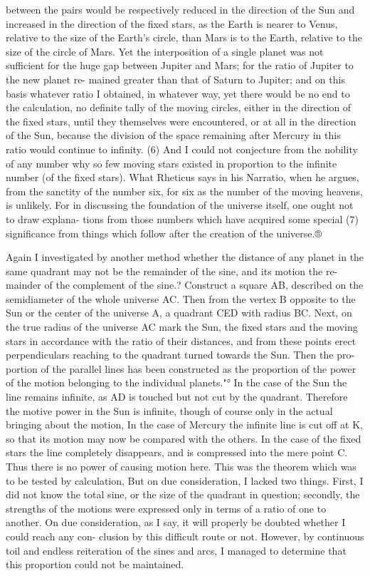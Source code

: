 \documentclass{article}
\begin{document}
{{{{{{{{{between the pairs would be respectively reduced in the direction of the Sun and
increased in the direction of the fixed stars, as the Earth is nearer to Venus, relative
to the size of the Earth’s circle, than Mars is to the Earth, relative to the size of the
circle of Mars. Yet the interposition of a single planet was not sufficient for the
huge gap between Jupiter and Mars; for the ratio of Jupiter to the new planet re-
mained greater than that of Saturn to Jupiter; and on this basis whatever ratio I
obtained, in whatever way, yet there would be no end to the calculation, no
definite tally of the moving circles, either in the direction of the fixed stars, until
they themselves were encountered, or at all in the direction of the Sun, because
the division of the space remaining after Mercury in this ratio would continue to
infinity. (6) And I could not conjecture from the nobility of any number why so
few moving stars existed in proportion to the infinite number (of the fixed stars).
What Rheticus says in his Narratio, when he argues, from the sanctity of the
number six, for six as the number of the moving heavens, is unlikely. For in
discussing the foundation of the universe itself, one ought not to draw explana-
tions from those numbers which have acquired some special (7) significance from
things which follow after the creation of the universe.®

Again I investigated by another method whether the distance of any planet in
the same quadrant may not be the remainder of the sine, and its motion the re-
mainder of the complement of the sine.? Construct a square AB, described on the
semidiameter of the whole universe AC. Then from the vertex B opposite to the
Sun or the center of the universe A, a quadrant CED with radius BC. Next, on the
true radius of the universe AC mark the Sun, the fixed stars and the moving stars
in accordance with the ratio of their distances, and from these points erect
perpendiculars reaching to the quadrant turned towards the Sun. Then the pro-
portion of the parallel lines has been constructed as the proportion of the power
of the motion belonging to the individual planets."° In the case of the Sun the line
remains infinite, as AD is touched but not cut by the quadrant. Therefore the
motive power in the Sun is infinite, though of course only in the actual bringing
about the motion, In the case of Mercury the infinite line is cut off at K, so that its
motion may now be compared with the others. In the case of the fixed stars the
line completely disappears, and is compressed into the mere point C. Thus there is
no power of causing motion here. This was the theorem which was to be tested by
calculation, But on due consideration, I lacked two things. First, I did not know
the total sine, or the size of the quadrant in question; secondly, the strengths of
the motions were expressed only in terms of a ratio of one to another. On due
consideration, as I say, it will properly be doubted whether I could reach any con-
clusion by this difficult route or not. However, by continuous toil and endless
reiteration of the sines and arcs, I managed to determine that this proportion
could not be maintained.

}}}}}}}}}
\end{document}
